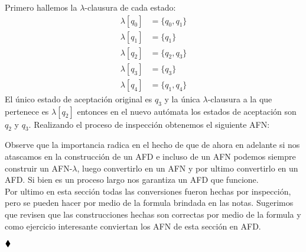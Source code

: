 Primero hallemos la $\lambda$-clausura de cada estado:
\begin{align*}
    \lambda[q_0]&=\{q_0,q_1\}\\
    \lambda[q_1]&=\{q_1\}\\
    \lambda[q_2]&=\{q_2,q_3\}\\
    \lambda[q_3]&=\{q_3\}\\ 
    \lambda[q_4]&=\{q_1,q_4\}
\end{align*}
El único estado de aceptación original es $q_3$ y la única $\lambda$-clausura a la que pertenece es $\lambda[q_2]$ entonces en el nuevo autómata los estados de aceptación son $q_2$ y $q_3$. Realizando el proceso de inspección obtenemos el siguiente AFN:
\begin{basedtikz}
\centering
\end{basedtikz}
Observe que la importancia radica en el hecho de que de ahora en adelante si nos atascamos en la construcción de un AFD e incluso de un AFN podemos siempre construir un AFN-$\lambda$, luego convertirlo en un AFN y por ultimo convertirlo en un AFD. Si bien es un proceso largo nos garantiza un AFD que funcione.\\
Por ultimo en esta sección todas las conversiones fueron hechas por inspección, pero se pueden hacer por medio de la formula brindada en las notas. Sugerimos que revisen que las construcciones hechas son correctas por medio de la formula y como ejercicio interesante conviertan los AFN de esta sección en AFD.

$\hfill \blacklozenge$